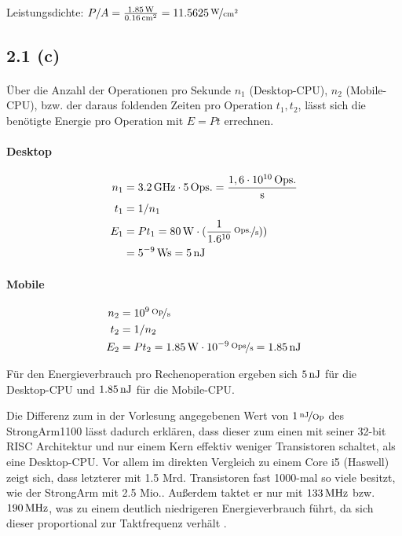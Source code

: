 \documentclass[11pt,a4paper]{article}
\begin{document}
Leistungsdichte: $P/A = \frac{\unit[1.85]{W}}{\unit[0.16]{cm^2}} = \unitfrac[11.5625]{W}{cm^2}$

\subsection{2.1 (c)}

\paragraph{}
Über die Anzahl der Operationen pro Sekunde $n_1$ (Desktop-CPU), $n_2$ (Mobile-CPU), bzw. der daraus foldenden Zeiten pro Operation $t_1, t_2$, lässt sich die benötigte Energie pro Operation mit $E = Pt$ errechnen.

\paragraph{Desktop}
\begin{align*}
n_1 &= \unit[3.2]{GHz} \cdot \unit[5]{Ops.} = \frac{1,6 \cdot \unit[10^{10}]{Ops.}}{\unit{s}}\\
t_1 &= 1/n_1\\
E_1 &= Pt_1 = \unit[80]{W} \cdot (\unitfrac[\frac{1}{1.6^{10}}]{Ops.}{s}))\\
&= \unit[5^{-9}]{Ws} = \unit[5]{nJ}\\
\end{align*}

\paragraph{Mobile}
\begin{align*}
n_2 &= \unitfrac[10^9]{Op}{s}\\
t_2 &= 1/n_2\\
E_2 &= Pt_2 = \unit[1.85]{W} \cdot \unitfrac[10^{-9}]{Ops}{s} = \unit[1.85]{nJ}
\end{align*}

Für den Energieverbrauch pro Rechenoperation ergeben sich $\unit[5]{nJ}$ für die Desktop-CPU und $\unit[1.85]{nJ}$ für die Mobile-CPU.

Die Differenz zum in der Vorlesung angegebenen Wert von $\unitfrac[1]{nJ}{Op}$ des StrongArm1100 lässt dadurch erklären, dass dieser zum einen mit seiner 32-bit RISC Architektur und nur einem Kern effektiv weniger Transistoren schaltet, als eine Desktop-CPU. Vor allem im direkten Vergleich zu einem Core i5 (Haswell) zeigt sich, dass letzterer mit 1.5 Mrd. Transistoren fast 1000-mal so viele besitzt, wie der StrongArm mit 2.5 Mio.. Außerdem taktet er nur mit $\unit[133]{MHz}$ bzw. $\unit[190]{MHz}$, was zu einem deutlich niedrigeren Energieverbrauch führt, da sich dieser proportional zur Taktfrequenz verhält\cite{wiki:1} \cite{intel:1}.
\end{document}
